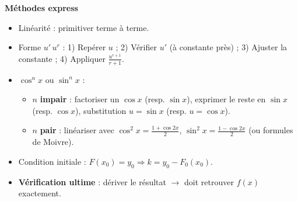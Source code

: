 \documentclass[11pt]{article}
\newcommand{\cle}[1]{{\popxbold\color{popdark}#1}}
\begin{document}
\begin{bilan}
\textbf{Méthodes express}
\begin{itemize}
  \item \cle{Linéarité} : primitiver terme à terme.
  \item \cle{Forme $u'\,u^r$} : 1) Repérer $u$ ; 2) Vérifier $u'$ (à constante près) ; 3) Ajuster la constante ; 4) Appliquer $\frac{u^{r+1}}{r+1}$.
  \item \cle{$\cos^n x$ ou $\sin^n x$} :
  \begin{itemize}
    \item $n$ \textbf{impair} : factoriser un $\cos x$ (resp. $\sin x$), exprimer le reste en $\sin x$ (resp. $\cos x$), substitution $u=\sin x$ (resp. $u=\cos x$).
    \item $n$ \textbf{pair} : linéariser avec $\cos^2 x=\frac{1+\cos 2x}{2}$, $\sin^2 x=\frac{1-\cos 2x}{2}$ (ou formules de Moivre).
  \end{itemize}
  \item \cle{Condition initiale} : $F(x_0)=y_0 \Rightarrow k = y_0 - F_0(x_0)$.
  \item \textbf{Vérification ultime} : dériver le résultat $\to$ doit retrouver $f(x)$ exactement.
\end{itemize}
\end{bilan}
\end{document}
